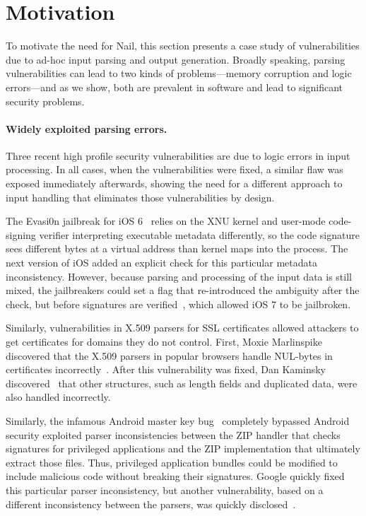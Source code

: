 \section{Motivation}
\label{s:motivation}

To motivate the need for Nail, this section presents a case study of
vulnerabilities due to ad-hoc input parsing and output generation.
Broadly speaking, parsing vulnerabilities can lead to two kinds of
problems---memory corruption and logic errors---and as we show, both
are prevalent in software and lead to significant security problems.

\paragraph{Widely exploited parsing errors.}

Three recent high profile security vulnerabilities are due to logic
errors in input processing.  In all cases, when the vulnerabilities were
fixed, a similar flaw was exposed immediately afterwards, showing the
need for a different approach to input handling that eliminates those
vulnerabilities by design.

The Evasi0n jailbreak for iOS 6~\cite{evaders6} relies on the XNU kernel and
user-mode code-signing verifier interpreting executable metadata differently, so the code signature
sees different bytes at a virtual address than kernel maps into the process. The next version of iOS
added an explicit check for this particular metadata inconsistency. However, because parsing and
processing of the input data is still mixed, the jailbreakers could set a flag that re-introduced
the ambiguity after the check, but before signatures are verified~\cite{geohot-evasion}, which
allowed iOS 7 to be jailbroken.

Similarly, vulnerabilities in X.509 parsers for SSL certificates allowed attackers to get
certificates for domains they do not control. First, Moxie Marlinspike discovered that the X.509
parsers in popular browsers handle NUL-bytes in certificates incorrectly~\cite{Marlinspike:SSL}. After this
vulnerability was fixed, Dan Kaminsky discovered~\cite{DBLP:conf/fc/KaminskyPS10} that other
structures, such as length fields and duplicated data, were also handled incorrectly.

Similarly, the infamous Android master key bug~\cite{saurik-masterkey} completely bypassed Android
security exploited parser inconsistencies
between the ZIP handler that checks signatures for privileged applications and the ZIP
implementation that ultimately extract those files. Thus, privileged application bundles could be
modified to include malicious code without breaking their signatures. Google quickly fixed this
particular parser inconsistency, but another vulnerability, based on a different inconsistency
between the parsers, was quickly disclosed~\cite{saurik-masterkey2}.

